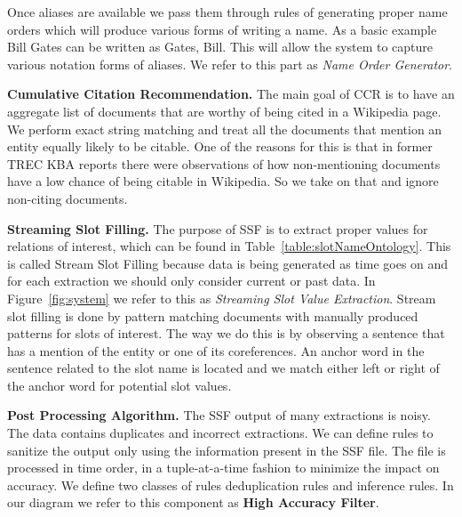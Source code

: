 Once aliases are available we pass them through rules of generating proper name 
orders which will produce various forms of writing a name. As a basic example Bill 
Gates can be written as Gates, Bill. This will allow the system to capture various 
notation forms of aliases. We refer to this part as \textit{Name Order Generator}.

\textbf{Cumulative Citation Recommendation.}
\label{sec:ccr1}
The main goal of CCR is to have an aggregate list of documents that are worthy of being cited in a Wikipedia page. We perform exact string matching 
and treat all the documents that mention an entity equally likely to be citable. One of the reasons for this is 
that in former TREC KBA reports \cite{JFrank12} there were observations of how 
non-mentioning documents have a low chance of being citable in Wikipedia.
So we take on that and ignore non-citing documents. 






\textbf{Streaming Slot Filling.}
\label{sec:ssf1}
The purpose of SSF is to extract proper values for relations of
interest, which can be found in Table~\ref{table:slotNameOntology}.
This is called Stream Slot Filling because data is being generated as time goes
on and for each extraction we should only consider current or past data.
In Figure~\ref{fig:system} we refer to this as \textit{Streaming Slot Value Extraction}.
Stream slot filling is done by pattern matching documents with manually 
produced patterns for slots of interest. The way we do this is by observing a 
sentence that has a mention of the entity or one of its coreferences. An 
anchor word in the sentence related to the slot name is located and we match 
either left or right of the anchor word for potential slot values. 

\textbf{Post Processing Algorithm.}
\label{sec:postproc}
The SSF output of many extractions is noisy. The data contains duplicates and 
incorrect extractions. We can define rules to sanitize the output only using 
the information present in the SSF file. The file is processed in time order, 
in a tuple-at-a-time fashion to minimize the impact on accuracy. We define 
two classes of rules deduplication rules and inference rules. In our diagram we refer to this component as \textbf{High Accuracy Filter}.
